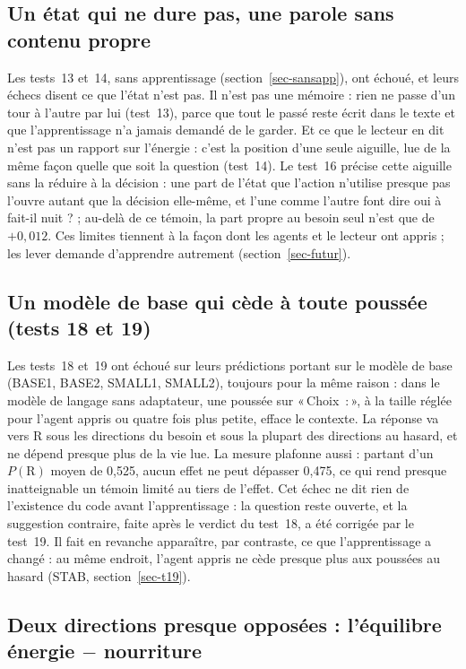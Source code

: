 \documentclass[11pt,a4paper]{article}
\newcommand{\Choix}{«\,Choix~:\,»}
\begin{document}
\subsection{Un état qui ne dure pas, une parole sans contenu propre}

Les tests~13 et~14, sans apprentissage (section~\ref{sec-sansapp}), ont échoué, et leurs
échecs disent ce que l'état n'est pas. Il n'est pas une mémoire : rien ne passe d'un
tour à l'autre par lui (test~13), parce que tout le passé reste écrit dans le texte et
que l'apprentissage n'a jamais demandé de le garder. Et ce que le lecteur en dit n'est
pas un rapport sur l'énergie : c'est la position d'une seule aiguille, lue de la même
façon quelle que soit la question (test~14). Le test~16 précise cette aiguille sans la
réduire à la décision : une part de l'état que l'action n'utilise presque pas l'ouvre
autant que la décision elle-même, et l'une comme l'autre font dire \og oui \fg{} à
\og fait-il nuit ? \fg{} ; au-delà de ce témoin, la part propre au besoin seul n'est que
de $+0,012$. Ces limites tiennent à la façon dont
les agents et le lecteur ont appris ; les lever demande d'apprendre autrement
(section~\ref{sec-futur}).

\subsection{Un modèle de base qui cède à toute poussée (tests 18 et 19)}
\label{sec-sature}

Les tests~18 et~19 ont échoué sur leurs prédictions portant sur le modèle de base (BASE1,
BASE2, SMALL1, SMALL2), toujours pour la même raison : dans le modèle de langage sans
adaptateur, une poussée sur \Choix{}, à la taille réglée pour l'agent appris ou quatre fois
plus petite, efface le contexte. La réponse va vers R sous les directions du besoin et sous la
plupart des directions au hasard, et ne dépend presque plus de la vie lue. La mesure plafonne
aussi : partant d'un $P(\mathrm R)$ moyen de 0,525, aucun effet ne peut dépasser 0,475, ce qui
rend presque inatteignable un témoin limité au tiers de l'effet. Cet échec ne dit rien de
l'existence du code avant l'apprentissage : la question reste ouverte, et la suggestion
contraire, faite après le verdict du test~18, a été corrigée par le test~19. Il fait en revanche
apparaître, par contraste, ce que l'apprentissage a changé : au même endroit, l'agent appris ne
cède presque plus aux poussées au hasard (STAB, section~\ref{sec-t19}).

\subsection{Deux directions presque opposées : l'équilibre énergie \texorpdfstring{$-$}{-} nourriture}
\label{sec-axe}
\end{document}

